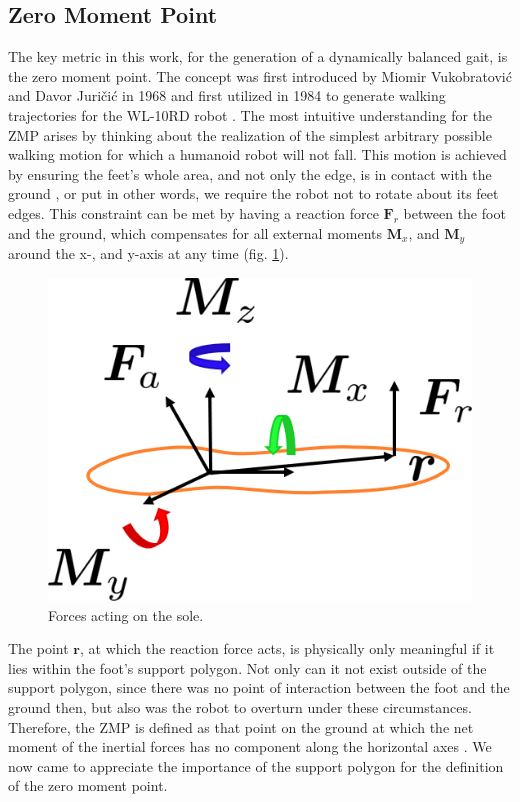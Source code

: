 \FloatBarrier
\subsection{Zero Moment Point}
\label{sec::211_zmp}
The key metric in this work, for the generation of a dynamically balanced gait, is the zero moment point. The concept was first introduced by Miomir Vukobratovi\'{c} and Davor Juri\v{c}i\'{c} in 1968 \cite{vukobratovic1968contribution}\cite{vukobratovic1969contribution} and first utilized in 1984 to generate walking trajectories for the WL-10RD robot \cite{yamaguchi1993development}. The most intuitive understanding for the ZMP arises by thinking about the realization of the simplest arbitrary possible walking motion for which a humanoid robot will not fall. This motion is achieved by ensuring the feet's whole area, and not only the edge, is in contact with the ground \cite{vukobratovic2004zero}, or put in other words, we require the robot not to rotate about its feet edges. This constraint can be met by having a reaction force $\bm{F}_r$ between the foot and the ground, which compensates for all external moments $\bm{M}_x$, and $\bm{M}_y$ around the x-, and y-axis at any time (fig. \ref{fig::211_zmp}).
\begin{figure}[h!]
	\centering
	\includegraphics[scale=.5]{chapters/02_background/img/zero_moment_point.png}
	\caption{Forces acting on the sole.}
	\label{fig::211_zmp}
\end{figure}
The point $\bm{r}$, at which the reaction force acts, is physically only meaningful if it lies within the foot's support polygon. Not only can it not exist outside of the support polygon, since there was no point of interaction between the foot and the ground then, but also was the robot to overturn under these circumstances. Therefore, the ZMP is defined as that point on the ground at which the net moment of the inertial forces has no component along the horizontal axes \cite{hirai1998development}\cite{dasgupta1999making}. We now came to appreciate the importance of the support polygon for the definition of the zero moment point. 
